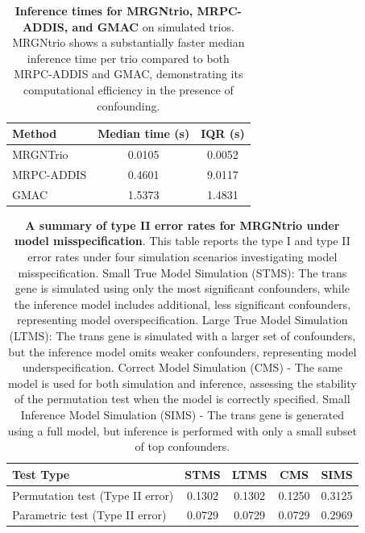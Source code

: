 \documentclass[12pt,letterpaper]{report}
\begin{document}
\begin{table}[H]
	\caption{\textbf{Inference times for MRGNtrio, MRPC-ADDIS, and GMAC} on simulated trios. MRGNtrio shows a substantially faster median inference time per trio compared to both MRPC-ADDIS and GMAC, demonstrating its computational efficiency in the presence of confounding.}
	\label{tab:time_comp}
	\centering
	\begin{tabular}{lcc}
		\toprule
		\textbf{Method} & \textbf{Median time (s)} & \textbf{IQR (s)} \\
		\midrule
		MRGNTrio & 0.0105 & 0.0052 \\
		MRPC-ADDIS & 0.4601 & 9.0117 \\
		GMAC & 1.5373 & 1.4831 \\
		\bottomrule
	\end{tabular}
\end{table}

\begin{table}[H]
	\caption{\textbf{A summary of type II error rates for MRGNtrio under model misspecification}. This table reports the type I and type II error rates under four simulation scenarios investigating model misspecification. Small True Model Simulation (STMS): The trans gene is simulated using only the most significant confounders, while the inference model includes additional, less significant confounders, representing model overspecification. Large True Model Simulation (LTMS): The trans gene is simulated with a larger set of confounders, but the inference model omits weaker confounders, representing model underspecification. Correct Model Simulation (CMS) - The same model is used for both simulation and inference, assessing the stability of the permutation test when the model is correctly specified. Small Inference Model Simulation (SIMS) - The trans gene is generated using a full model, but inference is performed with only a small subset of top confounders.}
	\label{tab:S10_Model_miss_Type_II_error_rates}
	\begin{tabular}{lcccc}
		\toprule
		\textbf{Test Type} & \textbf{STMS} & \textbf{LTMS} & \textbf{CMS} & \textbf{SIMS} \\
		\midrule
		Permutation test (Type II error) & 0.1302 & 0.1302 & 0.1250 & 0.3125 \\
		Parametric test (Type II error) & 0.0729 & 0.0729 & 0.0729 & 0.2969 \\
		\bottomrule
	\end{tabular}
\end{table}
\end{document}

